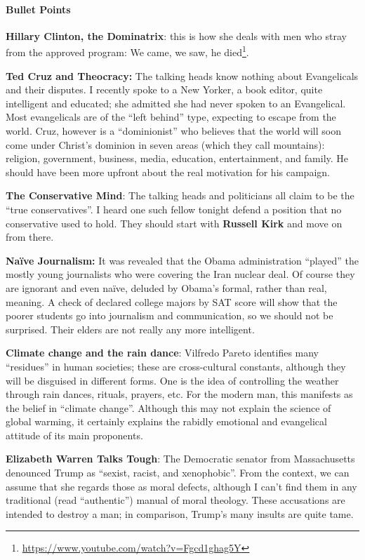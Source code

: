 \paragraph{Bullet Points}


\textbf{Hillary Clinton, the Dominatrix}: this is how she deals with men who stray from the approved program: We came, we saw, he died\footnote{\url{https://www.youtube.com/watch?v=Fgcd1ghag5Y}}.

\textbf{Ted Cruz and Theocracy:} The talking heads know nothing about Evangelicals and their disputes. I recently spoke to a New Yorker, a book editor, quite intelligent and educated; she admitted she had never spoken to an Evangelical. Most evangelicals are of the ``left behind'' type, expecting to escape from the world. Cruz, however is a ``dominionist'' who believes that the world will soon come under Christ's dominion in seven areas (which they call mountains): religion, government, business, media, education, entertainment, and family. He should have been more upfront about the real motivation for his campaign.

\textbf{The Conservative Mind}: The talking heads and politicians all claim to be the ``true conservatives''. I heard one such fellow tonight defend a position that no conservative used to hold. They should start with \textbf{Russell Kirk} and move on from there.

\textbf{Naïve Journalism:} It was revealed that the Obama administration ``played'' the mostly young journalists who were covering the Iran nuclear deal. Of course they are ignorant and even naïve, deluded by Obama's formal, rather than real, meaning. A check of declared college majors by SAT score will show that the poorer students go into journalism and communication, so we should not be surprised. Their elders are not really any more intelligent.

\textbf{Climate change and the rain dance}: Vilfredo Pareto identifies many ``residues'' in human societies; these are cross-cultural constants, although they will be disguised in different forms. One is the idea of controlling the weather through rain dances, rituals, prayers, etc. For the modern man, this manifests as the belief in ``climate change''. Although this may not explain the science of global warming, it certainly explains the rabidly emotional and evangelical attitude of its main proponents.

\textbf{Elizabeth Warren Talks Tough}: The Democratic senator from Massachusetts denounced Trump as ``sexist, racist, and xenophobic''. From the context, we can assume that she regards those as moral defects, although I can't find them in any traditional (read ``authentic'') manual of moral theology. These accusations are intended to destroy a man; in comparison, Trump's many insults are quite tame.

